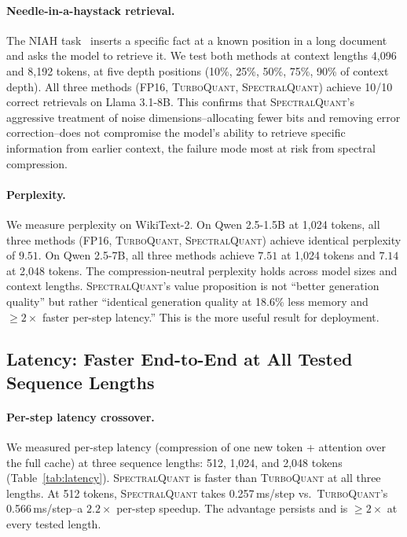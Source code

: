 \documentclass[11pt]{article}
\newcommand{\TQ}{\textsc{TurboQuant}}
\newcommand{\SQ}{\textsc{SpectralQuant}}
\begin{document}
\paragraph{Needle-in-a-haystack retrieval.}
The NIAH task~\citep{needle2023} inserts a specific fact at a known position
in a long document and asks the model to retrieve it.  We test both methods at
context lengths 4{,}096 and 8{,}192 tokens, at five depth positions (10\%,
25\%, 50\%, 75\%, 90\% of context depth).  All three methods (FP16, \TQ{},
\SQ{}) achieve 10/10 correct retrievals on Llama 3.1-8B.  This confirms that
\SQ{}'s aggressive treatment of noise dimensions--allocating fewer bits and
removing error correction--does not compromise the model's ability to retrieve
specific information from earlier context, the failure mode most at risk from
spectral compression.

\paragraph{Perplexity.}
We measure perplexity on WikiText-2.  On Qwen 2.5-1.5B at 1{,}024 tokens, all
three methods (FP16, \TQ{}, \SQ{}) achieve identical perplexity of $9.51$.
On Qwen 2.5-7B, all three methods achieve $7.51$ at 1{,}024 tokens and $7.14$
at 2{,}048 tokens.  The compression-neutral perplexity holds across model
sizes and context lengths.  \SQ{}'s value proposition is not ``better
generation quality'' but rather ``identical generation quality at 18.6\%
less memory and $\geq 2\times$ faster per-step latency.''  This is the more
useful result for deployment.

\subsection{Latency: Faster End-to-End at All Tested Sequence Lengths}
\label{sec:latency}

\paragraph{Per-step latency crossover.}
We measured per-step latency (compression of one new token + attention over
the full cache) at three sequence lengths: 512, 1{,}024, and 2{,}048 tokens
(Table~\ref{tab:latency}).  \SQ{} is faster than \TQ{} at all three lengths.
At 512 tokens, \SQ{} takes 0.257\,ms/step vs.\ \TQ{}'s 0.566\,ms/step--a
$2.2\times$ per-step speedup.  The advantage persists and is $\geq 2\times$ at
every tested length.
\end{document}
